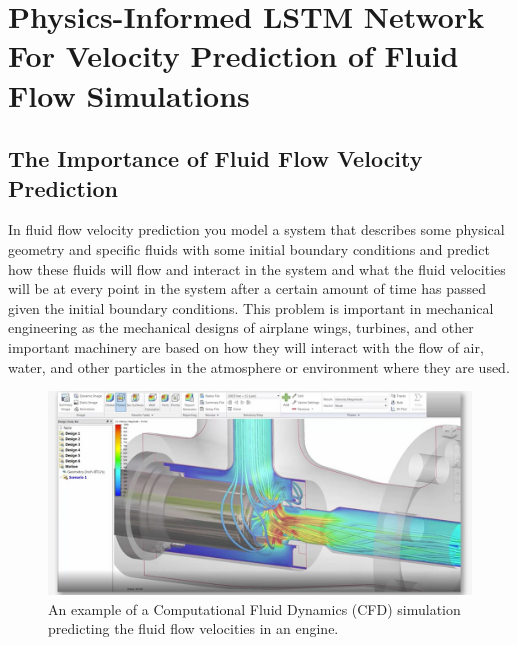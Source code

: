 \chapter{Physics-Informed LSTM Network For Velocity Prediction of Fluid Flow Simulations}
\section{The Importance of Fluid Flow Velocity Prediction}
In fluid flow velocity prediction you model a system that describes some physical geometry and specific fluids with some initial boundary conditions and predict how these fluids will flow and interact in the system and what the fluid velocities will be at every point in the system after a certain amount of time has passed given the initial boundary conditions. This problem is important in mechanical engineering as the mechanical designs of airplane wings, turbines, and other important machinery are based on how they will interact with the flow of air, water, and other particles in the atmosphere or environment where they are used.

\begin{figure}[H] \centering
    \includegraphics[width=\linewidth]{figures/cfd_engine.png}
    \caption{An example of a Computational Fluid Dynamics (CFD) simulation predicting the fluid flow velocities in an engine.}
    \label{fig:cfd_engine}
\end{figure}

